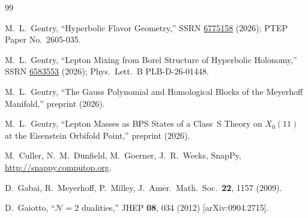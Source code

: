 \documentclass[11pt,a4paper]{article}
\theoremstyle{definition}
\theoremstyle{remark}
\begin{document}
\begin{thebibliography}{99}

M.~L.~Gentry,
``Hyperbolic Flavor Geometry,''
SSRN \href{https://doi.org/10.2139/ssrn.6775158}{6775158} (2026);
PTEP Paper No.\ 2605-035.

M.~L.~Gentry,
``Lepton Mixing from Borel Structure of Hyperbolic Holonomy,''
SSRN \href{https://doi.org/10.2139/ssrn.6583553}{6583553} (2026);
Phys.\ Lett.\ B PLB-D-26-01448.

M.~L.~Gentry,
``The Gauss Polynomial and Homological Blocks of the Meyerhoff Manifold,''
preprint (2026).

M.~L.~Gentry,
``Lepton Masses as BPS States of a Class~S Theory on $X_0(11)$
at the Eisenstein Orbifold Point,''
preprint (2026).

M.~Culler, N.~M.~Dunfield, M.~Goerner, J.~R.~Weeks,
SnapPy, \url{http://snappy.computop.org}.

D.~Gabai, R.~Meyerhoff, P.~Milley,
J.\ Amer.\ Math.\ Soc.\ \textbf{22}, 1157 (2009).

D.~Gaiotto,
``$\mathcal{N}=2$ dualities,''
JHEP \textbf{08}, 034 (2012) [arXiv:0904.2715].

\end{thebibliography}
\end{document}
